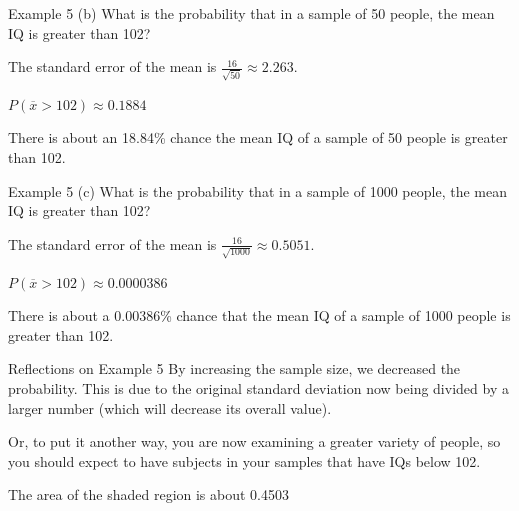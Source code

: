 \documentclass[t]{beamer}
\begin{document}
\begin{frame}{Example 5}
(b)	\quad	What is the probability that in a sample of 50 people, the mean IQ is greater than 102?	\newline\\	\pause

The standard error of the mean is $\frac{16}{\sqrt{50}} \approx 2.263$.	\newline\\	\pause

$P(\overline{x} > 102) \approx 0.1884$	\newline\\	\pause

There is about an 18.84\% chance the mean IQ of a sample of 50 people is greater than 102.
\end{frame}

\begin{frame}{Example 5}
(c)	\quad What is the probability that in a sample of 1000 people, the mean IQ is greater than 102?	\newline\\	\pause

The standard error of the mean is $\frac{16}{\sqrt{1000}} \approx 0.5051$.	\newline\\	\pause

$P(\overline{x} > 102) \approx 0.0000386$	\newline\\	\pause

There is about a 0.00386\% chance that the mean IQ of a sample of 1000 people is greater than 102.
\end{frame}

\begin{frame}{Reflections on Example 5}
By increasing the sample size, we decreased the probability. This is due to the original standard deviation now being divided by a larger number (which will decrease its overall value).	\newline\\	\pause

Or, to put it another way, you are now examining a greater variety of people, so you should expect to have subjects in your samples that have IQs below 102.
\begin{center}
\end{center}
The area of the shaded region is about 0.4503
\end{frame}
\end{document}
